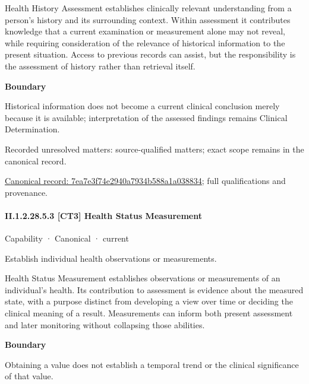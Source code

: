 Health History Assessment establishes clinically relevant understanding from a person's history and its surrounding context. Within assessment it contributes knowledge that a current examination or measurement alone may not reveal, while requiring consideration of the relevance of historical information to the present situation. Access to previous records can assist, but the responsibility is the assessment of history rather than retrieval itself.



\textbf{Boundary}



Historical information does not become a current clinical conclusion merely because it is available; interpretation of the assessed findings remains Clinical Determination.


{\small Recorded unresolved matters: source-qualified matters; exact scope remains in the canonical record.}\par
{\footnotesize \href{../../../../continuum/strategy/capability/7ea7e3f74e2940a7934b588a1a038834.md}{Canonical record: 7ea7e3f74e2940a7934b588a1a038834}; full qualifications and provenance.}\par
\paragraph*{II.1.2.28.5.3 [CT3] Health Status Measurement}
\label{navigation:II.1.2.28.5.3}

\label{element:a796bfb3335d44f6aeb9970628ed8554}
{\small Capability · Canonical · current}\par

Establish individual health observations or measurements.



Health Status Measurement establishes observations or measurements of an individual's health. Its contribution to assessment is evidence about the measured state, with a purpose distinct from developing a view over time or deciding the clinical meaning of a result. Measurements can inform both present assessment and later monitoring without collapsing those abilities.



\textbf{Boundary}



Obtaining a value does not establish a temporal trend or the clinical significance of that value.



